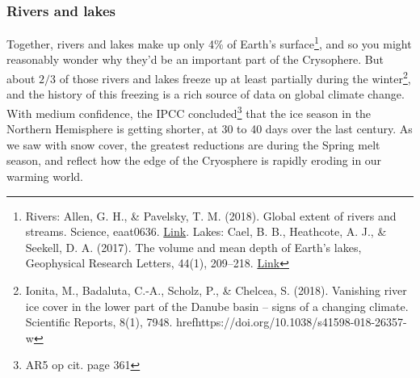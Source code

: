 \documentclass[amstex,12pt]{book}
\begin{document}
\subsubsection{Rivers and lakes} Together, rivers and lakes make up only 4\% of Earth's surface\footnote{Rivers: Allen, G. H., \& Pavelsky, T. M. (2018). Global extent of rivers and streams. Science, eaat0636. \href{https://doi.org/10.1126/science.aat0636}{Link}. Lakes: Cael, B. B., Heathcote, A. J., \& Seekell, D. A. (2017). The volume and mean depth of Earth’s lakes, Geophysical Research Letters, 44(1), 209–218. \href{https://doi.org/10.1002/2016GL071378}{Link}}, and so you might reasonably wonder why they'd be an important part of the Crysophere. But about $2/3$ of those rivers and lakes freeze up at least partially during the winter\footnote{Ionita, M., Badaluta, C.-A., Scholz, P., \& Chelcea, S. (2018). Vanishing river ice cover in the lower part of the Danube basin – signs of a changing climate. Scientific Reports, 8(1), 7948. href{https://doi.org/10.1038/s41598-018-26357-w}}, and the history of this freezing is a rich source of data on global climate change. With medium confidence, the IPCC concluded\footnote{AR5 op cit. page 361} that the ice season in the Northern Hemisphere is getting shorter, at 30 to 40 days over the last century. As we saw with snow cover, the greatest reductions are during the Spring melt season, and reflect how the edge of the Cryosphere is rapidly eroding in our warming world. 
\end{document}
